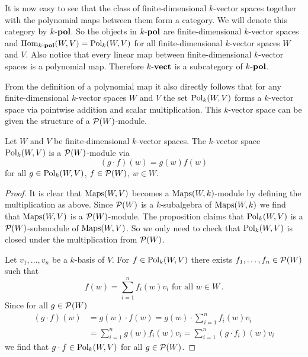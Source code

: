 It is now easy to see that the class of finite-dimensional $k$-vector spaces together with the polynomial maps between them form a category.
We will denote this category by $k\text{-}\mathbf{pol}$.
So the objects in $k\text{-}\mathbf{pol}$ are finite-dimensional $k$-vector spaces and $\operatorname{Hom}_{k\text{-}\mathbf{pol}}(W,V) = \operatorname{Pol}_k(W,V)$ for all finite-dimensional $k$-vector spaces $W$ and $V$.
Also notice that every linear map between finite-dimensional $k$-vector spaces is a polynomial map.
Therefore $k\text{-}\mathbf{vect}$ is a subcategory of $k\text{-}\mathbf{pol}$.

From the definition of a polynomial map it also directly follows that for any finite-dimensional $k$-vector spaces $W$ and $V$ the set $\operatorname{Pol}_k(W,V)$ forms a $k$-vector space via pointwise addition and scalar multiplication.
This $k$-vector space can be given the structure of a $\mathcal{P}(W)$-module.

\begin{proposition}
  Let $W$ and $V$ be finite-dimensional $k$-vector spaces.
  The $k$-vector space $\operatorname{Pol}_k(W,V)$ is a $\mathcal{P}(W)$-module via
  \[
      (g \cdot f)(w)
    = g(w) f(w)
  \]
  for all $g \in \operatorname{Pol}_k(W,V)$,
  $f \in \mathcal{P}(W)$,
  $w \in W$.
\end{proposition}
\begin{proof}
  It is clear that $\operatorname{Maps}(W,V)$ becomes a $\operatorname{Maps}(W,k)$-module by defining the multiplication as above.
  Since $\mathcal{P}(W)$ is a $k$-subalgebra of $\operatorname{Maps}(W,k)$ we find that $\operatorname{Maps}(W,V)$ is a $\mathcal{P}(W)$-module.
  The proposition claims that $\operatorname{Pol}_k(W,V)$ is a $\mathcal{P}(W)$-submodule of $\operatorname{Maps}(W,V)$.
  So we only need to check that $\operatorname{Pol}_k(W,V)$ is closed under the multiplication from $\mathcal{P}(W)$.
  
  Let $v_1, \dotsc, v_n$ be a $k$-basis of $V$.
  For $f \in \operatorname{Pol}_k(W,V)$ there exists $f_1, \dotsc, f_n \in \mathcal{P}(W)$ such that
  \[
      f(w)
    = \sum_{i=1}^n f_i(w) v_i
    \text{ for all }
    w \in W \,.
  \]
  Since for all $g \in \mathcal{P}(W)$
  \begin{align*}
        (g \cdot f)(w)
    &=  g(w) \cdot f(w)
     =  g(w) \cdot \sum_{i=1}^n f_i(w) v_i \\
    &=  \sum_{i=1}^n g(w) f_i(w) v_i
     =  \sum_{i=1}^n (g \cdot f_i)(w) v_i
  \end{align*}
  we find that $g \cdot f \in \operatorname{Pol}_k(W,V)$ for all $g \in \mathcal{P}(W)$.
\end{proof}



